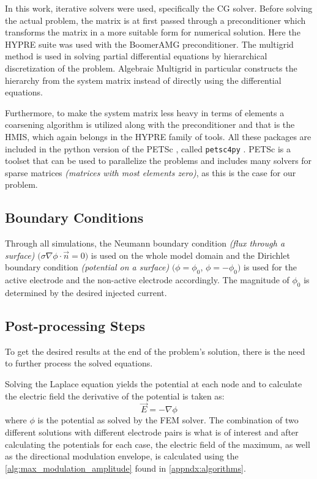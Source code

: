 In this work, iterative solvers were used, specifically the \gls{CG} solver. Before solving the actual problem, the matrix is at first passed through a preconditioner which transforms the matrix in a more suitable form for numerical solution. Here the \gls{HYPRE} \cite{hypre-web-page} suite was used with the Boomer\gls{AMG} \cite[chapter 4]{McCormick1987_amg} preconditioner. The multigrid method is used in solving partial differential equations by hierarchical discretization of the problem. Algebraic Multigrid in particular constructs the hierarchy from the system matrix instead of directly using the differential equations. 

Furthermore, to make the system matrix less heavy in terms of elements a coarsening algorithm is utilized along with the preconditioner and that is the \gls{HMIS}, which again belongs in the \gls{HYPRE} family of tools. All these packages are included in the python version of the \gls{PETSc} \cite{petsc-web-page,petsc-user-ref,petsc-efficient}, called \texttt{petsc4py} \cite{Dalcin2011}. \gls{PETSc} is a toolset that can be used to parallelize the problems and includes many solvers for sparse matrices \textit{(matrices with most elements zero)}, as this is the case for our problem.

\subsection{Boundary Conditions}
\label{subsec:solver_boundary_conditions}

Through all simulations, the Neumann boundary condition \textit{(flux through a surface)} $\big(\sigma\nabla\phi\cdot\vec{n} = 0\big)$ is used on the whole model domain and the Dirichlet boundary condition \textit{(potential on a surface)} $\big(\phi = \phi_0$, $\phi = -\phi_0\big)$ is used for the active electrode and the non-active electrode accordingly. The magnitude of $\phi_0$ is determined by the desired injected current.

\subsection{Post-processing Steps}

To get the desired results at the end of the problem's solution, there is the need to further process the solved equations.

Solving the Laplace equation yields the potential at each node and to calculate the electric field the derivative of the potential is taken as:
\begin{equation}
	\vec{E} = -\nabla\phi
\end{equation}
where $\phi$ is the potential as solved by the \gls{FEM} solver. The combination of two different solutions with different electrode pairs is what is of interest and after calculating the potentials for each case, the electric field of the maximum, as well as the directional modulation envelope, is calculated using the \autoref{alg:max_modulation_amplitude} found in \autoref{appndx:algorithms}.
